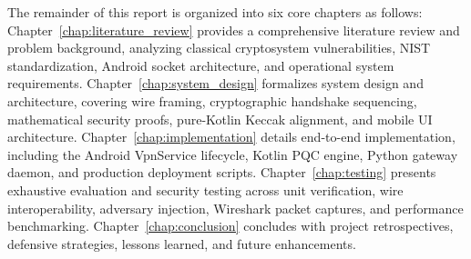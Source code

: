 The remainder of this report is organized into six core chapters as follows: Chapter~\ref{chap:literature_review} provides a comprehensive literature review and problem background, analyzing classical cryptosystem vulnerabilities, NIST standardization, Android socket architecture, and operational system requirements. Chapter~\ref{chap:system_design} formalizes system design and architecture, covering wire framing, cryptographic handshake sequencing, mathematical security proofs, pure-Kotlin Keccak alignment, and mobile UI architecture. Chapter~\ref{chap:implementation} details end-to-end implementation, including the Android VpnService lifecycle, Kotlin PQC engine, Python gateway daemon, and production deployment scripts. Chapter~\ref{chap:testing} presents exhaustive evaluation and security testing across unit verification, wire interoperability, adversary injection, Wireshark packet captures, and performance benchmarking. Chapter~\ref{chap:conclusion} concludes with project retrospectives, defensive strategies, lessons learned, and future enhancements.
